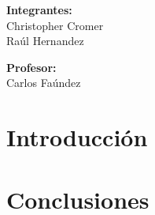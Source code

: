 \documentclass[12pt]{article}
\begin{document}
\hypersetup{pageanchor=false}
\clearpage\maketitle
\thispagestyle{empty}

\begin{flushright}
\textbf{Integrantes:}\\
Christopher Cromer\\
Raúl Hernandez
\end{flushright}

\begin{flushright}
\textbf{Profesor:}\\
Carlos Faúndez
\end{flushright}

\newpage

\clearpage
\thispagestyle{empty}
\tableofcontents

\newpage
\hypersetup{pageanchor=true}

\newpage
\section{Introducción}

\newpage
\section{Conclusiones}
\end{document}

